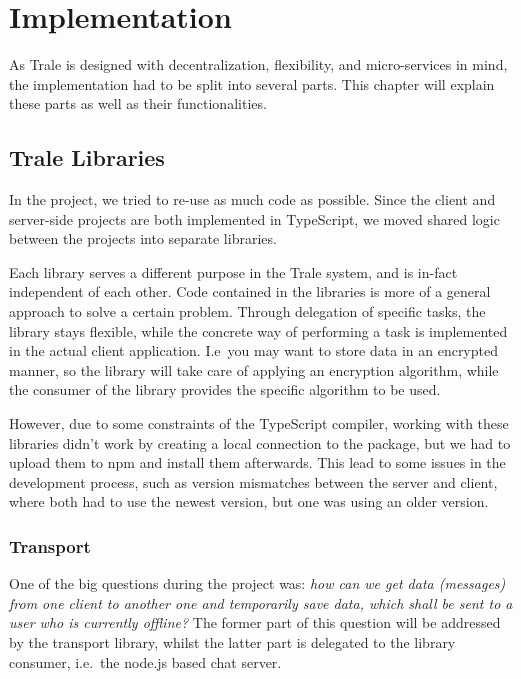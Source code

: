

\chapter{Implementation}\label{ch:implementation}
As Trale is designed with decentralization, flexibility, and micro-services in mind, the implementation had to be split
into several parts.
This chapter will explain these parts as well as their functionalities.

\section{Trale Libraries}\label{sec:libraries}
In the project, we tried to re-use as much code as possible.
Since the client and server-side projects are both implemented in TypeScript, we moved shared logic between the projects
into separate libraries.

Each library serves a different purpose in the Trale system, and is in-fact independent of each other.
Code contained in the libraries is more of a general approach to solve a certain problem.
Through delegation of specific tasks, the library stays flexible, while the concrete way of performing a task is
implemented in the actual client application.
I.e\  you may want to store data in an encrypted manner, so the library will take care of applying an encryption
algorithm, while the consumer of the library provides the specific algorithm to be used.

However, due to some constraints of the TypeScript compiler, working with these libraries didn't work by creating a
local connection to the package, but we had to upload them to npm and install them afterwards.
This lead to some issues in the development process, such as version mismatches between the server and client, where
both had to use the newest version, but one was using an older version.

\subsection{Transport}\label{subsec:transport}
One of the big questions during the project was: \textit{how can we get data (messages) from one client to another one
and temporarily save data, which shall be sent to a user who is currently offline?}
The former part of this question will be addressed by the transport library, whilst the latter part is delegated to the
library consumer, i.e.\ the node.js based chat server.


